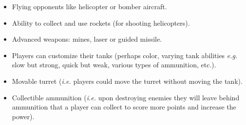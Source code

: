 \documentclass[letterpaper,11pt,twoside]{article}
\begin{document}
\begin{itemize}
 \item Flying opponents like helicopter or bomber aircraft.
 \item Ability to collect and use rockets (for shooting helicopters).
 \item Advanced weapons: mines, laser or guided missile.
 \item Players can customize their tanks (perhaps color, varying tank abilities \emph{e.g.} slow but strong, quick but weak, various types of ammunition, etc.).
 \item Movable turret (\emph{i.e.} players could move the turret without moving the tank).
 \item Collectible ammunition (\emph{i.e.} upon destroying enemies they will leave behind ammunition that a player can collect to score more points and increase the power).
\end{itemize}
\end{document}
